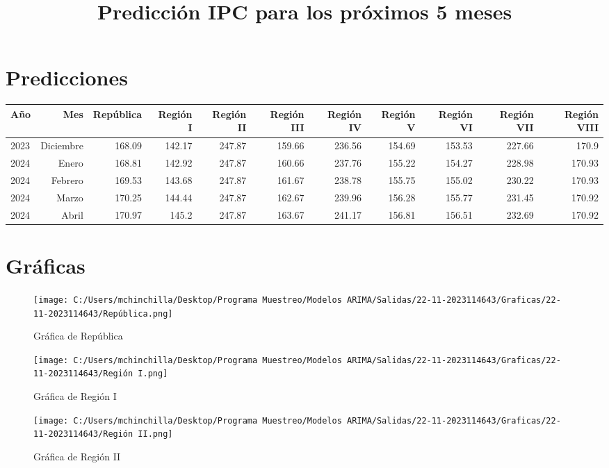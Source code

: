 \documentclass{article}%
\title{Predicción IPC para los próximos 5 meses}%
\date{}%
\begin{document}
%
\normalsize%
\maketitle%
\section{Predicciones}%
\label{sec:Predicciones}%
\begin{longtable}{|l r|r|r|r|r|r|r|r|r|r|}%
\hline%
Año&Mes&República&Región I&Región II&Región III&Región IV&Región V&Región VI&Región VII&Región VIII\\%
\hline%
2023&Diciembre&168.09&142.17&247.87&159.66&236.56&154.69&153.53&227.66&170.9\\%
2024&Enero&168.81&142.92&247.87&160.66&237.76&155.22&154.27&228.98&170.93\\%
2024&Febrero&169.53&143.68&247.87&161.67&238.78&155.75&155.02&230.22&170.93\\%
2024&Marzo&170.25&144.44&247.87&162.67&239.96&156.28&155.77&231.45&170.92\\%
2024&Abril&170.97&145.2&247.87&163.67&241.17&156.81&156.51&232.69&170.92\\%
\hline%
\end{longtable}

%
\section{Gráficas}%
\label{sec:Grficas}%


\begin{figure}[H]%
\centering%
\texttt{[image: C:/Users/mchinchilla/Desktop/Programa Muestreo/Modelos ARIMA/Salidas/22-11-2023114643/Graficas/22-11-2023114643/República.png]}%
\caption{Gráfica de República}%
\end{figure}

%


\begin{figure}[H]%
\centering%
\texttt{[image: C:/Users/mchinchilla/Desktop/Programa Muestreo/Modelos ARIMA/Salidas/22-11-2023114643/Graficas/22-11-2023114643/Región I.png]}%
\caption{Gráfica de Región I}%
\end{figure}

%


\begin{figure}[H]%
\centering%
\texttt{[image: C:/Users/mchinchilla/Desktop/Programa Muestreo/Modelos ARIMA/Salidas/22-11-2023114643/Graficas/22-11-2023114643/Región II.png]}%
\caption{Gráfica de Región II}%
\end{figure}
\end{document}
